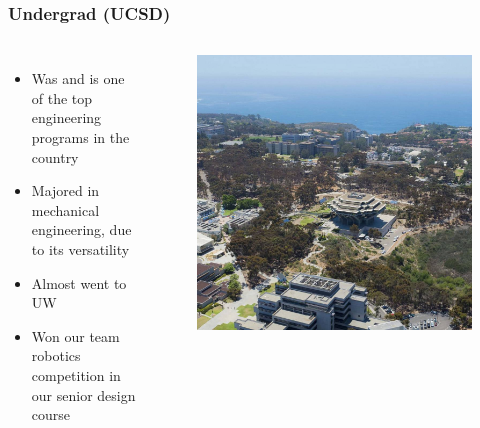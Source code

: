 \documentclass[aspectratio=169]{beamer}
\begin{document}
\begin{frame}
  \frametitle{Undergrad (UCSD)}
  \begin{columns}[t]            %
  \begin{itemize}
  \item Was and is one of the top engineering programs in the country
  \item Majored in  mechanical engineering, due to its versatility
  \item Almost went to UW
  \item Won our team robotics competition in our senior design course
  \end{itemize}

  \begin{figure}
    \includegraphics[width=0.7\linewidth]{UCSD.jpg}
  \end{figure}
  \end{columns}
\end{frame}
\end{document}
